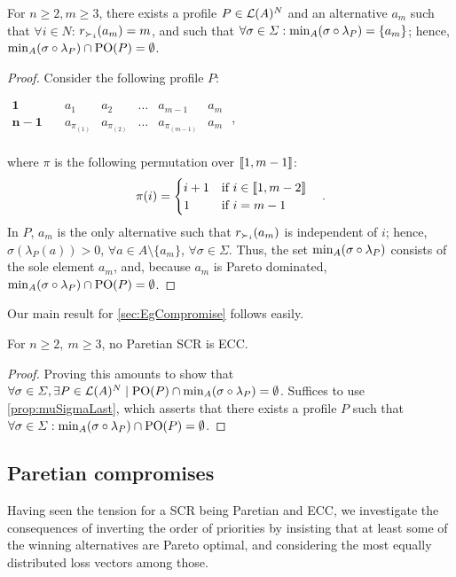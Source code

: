 \begin{proposition} \label{prop:muSigmaLast}
	For $n ≥ 2, m ≥ 3$, there exists a profile $P \in \mathcal{L}(A)^N$ and an alternative $a_m$ such that $\forall i \in N$: $r_{\prefi}(a_m)=m$, and such that $\forall \sigma \in \Sigma: \musigma = \set{a_m}$; hence, $\musigma \cap \paretopt(P) = \emptyset$.
\end{proposition}
\begin{proof}
	Consider the following profile $P$:
	\begin{center}
		$
		\begin{array}{cccccc}
			\mathbf{1} \quad &a_1&a_2&\dots&a_{m-1}&a_m\\
			\mathbf{n-1} \quad &a_{\pi_{(1)}}&a_{\pi_{(2)}}&\dots&a_{\pi_{(m-1)}}&a_m\\
		\end{array}
		$ \quad,
	\end{center}
	where $\pi$ is the following permutation over $\llbracket1, m-1\rrbracket$:
	\[
	\pi(i) = 
	\begin{cases}
		i+1 & \text{if } i \in \llbracket1, m-2\rrbracket \\
		1 & \text{if } i = m-1
	\end{cases} \quad .
	\]
	In $P$, $a_m$ is the only alternative such that $r_{\prefi}(a_m)$ is independent of $i$; hence, $\sigma(\lambda_P(a)) > 0$, $\forall a \in A\setminus \{a_m\}$, $\forall \sigma \in \Sigma$. Thus, the set $\musigma$ consists of the sole element $a_m$, and, because $a_m$ is Pareto dominated, $\musigma \cap \paretopt(P) = \emptyset$.
\end{proof}

Our main result for \cref{sec:EgCompromise} follows easily.
\begin{theorem} \label{th:nonParetian}
	For $n\geq 2, \ m\geq3$, no Paretian \ac{SCR} is ECC.
\end{theorem}
\begin{proof}
	Proving this amounts to show that $\forall \sigma \in \Sigma, \exists P \in \linors^N \suchthat \paretopt(P) \cap \musigma = \emptyset$. Suffices to use \cref{prop:muSigmaLast}, which asserts that there exists a profile $P$ such that $\forall \sigma \in \Sigma: \musigma \cap \paretopt(P) = \emptyset$.
\end{proof}

\subsection{Paretian compromises}
Having seen the tension for a \ac{SCR} being Paretian and ECC, we investigate the consequences of inverting the order of priorities by insisting that at least some of the winning alternatives are Pareto optimal, and considering the most equally distributed loss vectors among those.

